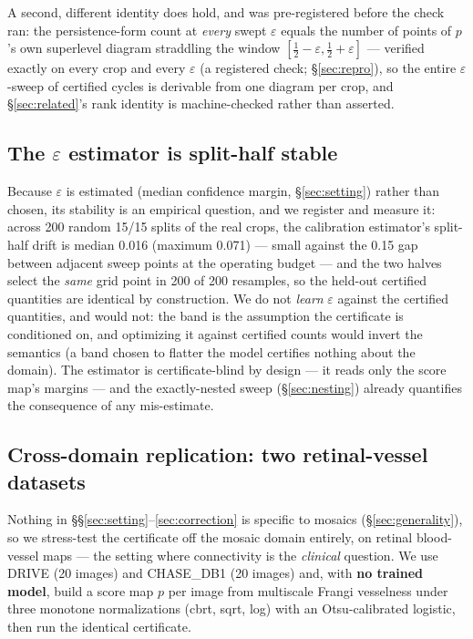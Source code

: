 \documentclass[10pt]{article}
\newcommand{\eps}{\varepsilon}
\begin{document}
A second, different identity does hold, and was pre-registered before the
check ran: the persistence-form count
at \emph{every} swept $\eps$ equals the number of points of $p$'s own
superlevel diagram straddling the window $[\tfrac12-\eps, \tfrac12+\eps]$
--- verified exactly on every crop and every $\eps$
(a registered check; \S\ref{sec:repro}), so the entire $\eps$-sweep of certified
cycles is derivable from one diagram per crop, and \S\ref{sec:related}'s
rank identity is machine-checked rather than asserted.

\subsection{The $\eps$ estimator is split-half stable}\label{sec:epsstab}

Because $\eps$ is estimated (median confidence margin,
\S\ref{sec:setting}) rather than chosen, its stability is an empirical
question, and we register and measure it: across 200 random 15/15 splits
of the real crops, the calibration estimator's split-half drift is median
0.016 (maximum 0.071) --- small against the 0.15 gap between adjacent
sweep points at the operating budget --- and the two halves select the
\emph{same} grid point in 200 of 200 resamples, so the held-out certified
quantities are identical by construction. We do not \emph{learn} $\eps$
against the certified quantities, and would not: the band is the
assumption the certificate is conditioned on, and optimizing it against
certified counts would invert the semantics (a band chosen to flatter the
model certifies nothing about the domain). The estimator is
certificate-blind by design --- it reads only the score map's margins ---
and the exactly-nested sweep (\S\ref{sec:nesting}) already quantifies the
consequence of any mis-estimate.

\subsection{Cross-domain replication: two retinal-vessel
datasets}\label{sec:crossdomain}

Nothing in \S\S\ref{sec:setting}--\ref{sec:correction} is specific to
mosaics (\S\ref{sec:generality}), so we stress-test the certificate off the
mosaic domain entirely, on retinal blood-vessel maps --- the setting where
connectivity is the \emph{clinical} question. We use DRIVE
\citep{staal2004drive} (20 images) and CHASE\_DB1 \citep{fraz2012chase}
(20 images) and, with \textbf{no trained model}, build a score map $p$ per
image from multiscale Frangi vesselness \citep{frangi1998vessel} under
three monotone normalizations (cbrt, sqrt, log) with an Otsu-calibrated
logistic, then run the identical certificate.
\end{document}

